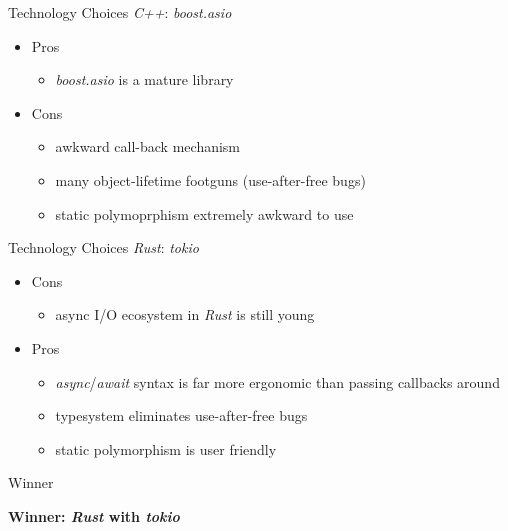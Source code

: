 \documentclass{beamer}
\begin{document}
\begin{frame}{Technology Choices}
  \emph{C++}: \emph{boost.asio}
  \begin{itemize}[<+->]
    \item<1> Pros
    \begin{itemize}[<+->]
      \item<1> \emph{boost.asio} is a mature library
    \end{itemize}
    \item<2> Cons
    \begin{itemize}[<+->]
      \item<2> awkward call-back mechanism
      \item<2> many object-lifetime footguns (use-after-free bugs)
      \item<2> static polymoprphism extremely awkward to use
    \end{itemize}
  \end{itemize}
\end{frame}

\begin{frame}{Technology Choices}
  \emph{Rust}: \emph{tokio}
  \begin{itemize}[<+->]
    \item<1> Cons
      \begin{itemize}[<+->]
        \item<1> async I/O ecosystem in \emph{Rust} is still young
      \end{itemize}
    \item<2> Pros
    \begin{itemize}[<+->]
      \item<2> \emph{async}/\emph{await} syntax is far more ergonomic than passing callbacks around
      \item<2> typesystem eliminates use-after-free bugs
      \item<2> static polymorphism is user friendly
    \end{itemize}
  \end{itemize}
\end{frame}

\begin{frame}{Winner}
  \begin{large}
    \begin{center}
      \textbf{Winner: \emph{Rust} with \emph{tokio}}
    \end{center}
  \end{large}
\end{frame}
\end{document}
